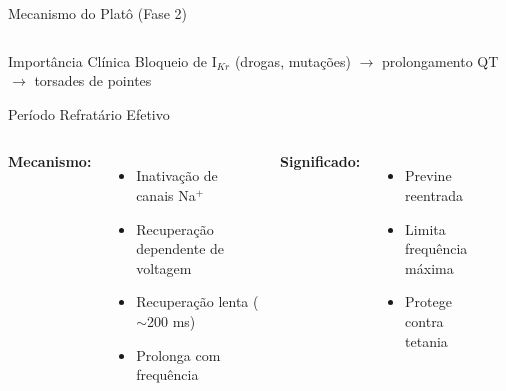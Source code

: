 \begin{frame}{Mecanismo do Platô (Fase 2)}
\begin{columns}
\begin{center}
\end{center}
\end{columns}

\vspace{0.3cm}

\begin{exampleblock}{Importância Clínica}
Bloqueio de I$_{Kr}$ (drogas, mutações) $\rightarrow$ prolongamento QT $\rightarrow$ torsades de pointes
\end{exampleblock}
\end{frame}

\begin{frame}{Período Refratário Efetivo}

\vspace{0.3cm}

\begin{columns}
\textbf{Mecanismo:}
\begin{itemize}
    \item Inativação de canais Na$^+$
    \item Recuperação dependente de voltagem
    \item Recuperação lenta ($\sim$200 ms)
    \item Prolonga com frequência
\end{itemize}

\vspace{0.3cm}

\textbf{Significado:}
\begin{itemize}
    \item Previne reentrada
    \item Limita frequência máxima
    \item Protege contra tetania
\end{itemize}

\begin{center}
\end{center}
\end{columns}
\end{frame}
